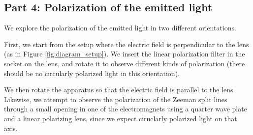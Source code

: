\subsection{Part 4: Polarization of the emitted light}

We explore the polarization of the emitted light in two different orientations.

First, we start from the setup where the electric field is perpendicular to the lens (as in Figure \ref{fig:diagram_setup}).
We insert the linear polarization filter in the socket on the lens, and rotate it to observe different kinds of polarization (there should be no circularly polarized light in this orientation).

We then rotate the apparatus so that the electric field is parallel to the lens.
Likewise, we attempt to observe the polarization of the Zeeman split lines through a small opening in one of the electromagnets using a quarter wave plate and a linear polarizing lens, since we expect ciruclarly polarized light on that axis.